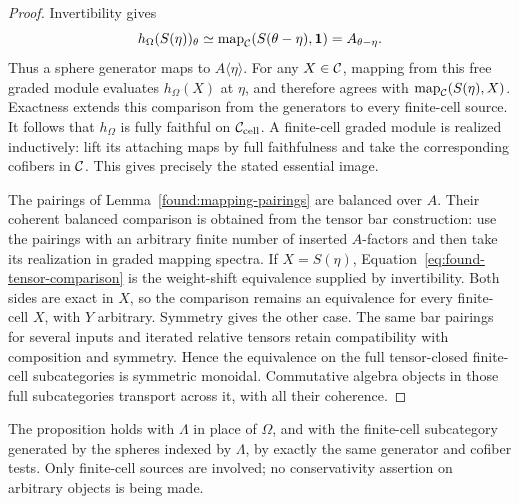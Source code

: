 \begin{proof}
Invertibility gives
\[
 h_\Omega(S(\eta))_\theta
   \simeq\operatorname{map}_{\mathcal C}(S(\theta-\eta),\mathbf 1)
   =A_{\theta-\eta}.
\]
Thus a sphere generator maps to $A\langle\eta\rangle$.  For any
$X\in\mathcal C$, mapping from this free graded module evaluates
$h_\Omega(X)$ at $\eta$, and therefore agrees with
$\operatorname{map}_{\mathcal C}(S(\eta),X)$.  Exactness extends this comparison from
the generators to every finite-cell source.  It follows that
$h_\Omega$ is fully faithful on $\mathcal C_{\mathrm{cell}}$.  A finite-cell
graded module is realized inductively: lift its attaching maps by
full faithfulness and take the corresponding cofibers in $\mathcal C$.
This gives precisely the stated essential image.

The pairings of Lemma~\ref{found:mapping-pairings} are balanced over
$A$.  Their coherent balanced comparison is obtained from the tensor
bar construction: use the pairings with an arbitrary finite number
of inserted $A$-factors and then take its realization in graded
mapping spectra.  If $X=S(\eta)$,
Equation~\eqref{eq:found-tensor-comparison} is the weight-shift
equivalence supplied by invertibility.  Both sides are exact in
$X$, so the comparison remains an equivalence for every finite-cell
$X$, with $Y$ arbitrary.  Symmetry gives the other case.
The same bar pairings for several inputs and iterated relative
tensors retain compatibility with composition and symmetry.  Hence
the equivalence on the full tensor-closed finite-cell subcategories
is symmetric monoidal.  Commutative algebra objects in those full
subcategories transport across it, with all their coherence.
\end{proof}

The proposition holds with $\Lambda$ in place of $\Omega$, and with
the finite-cell subcategory generated by the spheres indexed by
$\Lambda$, by exactly the same generator and cofiber tests.  Only
finite-cell sources are involved; no conservativity assertion on
arbitrary objects is being made.

